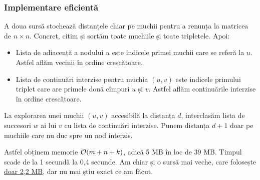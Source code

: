 \documentclass[../main.tex]{subfiles}
\begin{document}
\subsubsection*{Implementare eficientă}

A doua sursă stochează distanțele chiar pe muchii pentru a renunța la matricea de $n \times n$. Concret, citim și sortăm toate muchiile și toate tripletele. Apoi:

\begin{itemize}
  \item Lista de adiacență a nodului $u$ este indicele primei muchii care se referă la $u$. Astfel aflăm vecinii în ordine crescătoare.

  \item Lista de continuări interzise pentru muchia $(u,v)$ este indicele primului triplet care are primele două cîmpuri $u$ și $v$. Astfel aflăm continuările interzise în ordine crescătoare.
\end{itemize}

La explorarea unei muchii $(u,v)$ accesibilă la distanța $d$, interclasăm lista de succesori $w$ ai lui $v$ cu lista de continuări interzise. Punem distanța $d+1$ doar pe muchiile care nu duc spre un nod interzis.

Astfel obținem memorie $\mathcal{O}(m + n + k)$, adică 5 MB în loc de 39 MB. Timpul scade de la 1 secundă la 0,4 secunde. Am chiar și o sursă mai veche, care folosește \href{https://codeforces.com/contest/59/submission/244230310}{doar 2,2 MB}, dar nu mai știu exact ce am făcut. 
\end{document}

